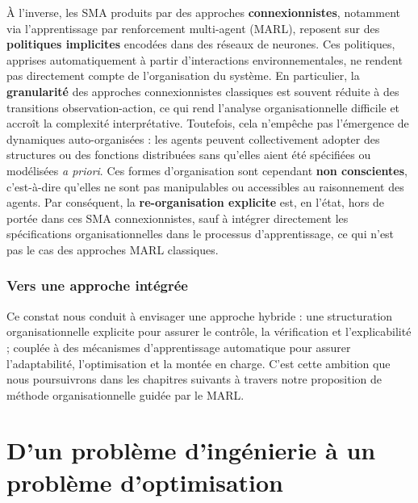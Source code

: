 À l'inverse, les \ac{SMA} produits par des approches \textbf{connexionnistes}, notamment via l'apprentissage par renforcement multi-agent (\ac{MARL}), reposent sur des \textbf{politiques implicites} encodées dans des réseaux de neurones. Ces politiques, apprises automatiquement à partir d'interactions environnementales, ne rendent pas directement compte de l'organisation du système. En particulier, la \textbf{granularité} des approches connexionnistes classiques est souvent réduite à des transitions observation-action, ce qui rend l'analyse organisationnelle difficile et accroît la complexité interprétative. Toutefois, cela n'empêche pas l'émergence de dynamiques auto-organisées : les agents peuvent collectivement adopter des structures ou des fonctions distribuées sans qu'elles aient été spécifiées ou modélisées \textit{a priori}. Ces formes d'organisation sont cependant \textbf{non conscientes}, c'est-à-dire qu'elles ne sont pas manipulables ou accessibles au raisonnement des agents. Par conséquent, la \textbf{re-organisation explicite} est, en l'état, hors de portée dans ces \ac{SMA} connexionnistes, sauf à intégrer directement les spécifications organisationnelles dans le processus d'apprentissage, ce qui n'est pas le cas des approches \ac{MARL} classiques.

\subsection*{Vers une approche intégrée}

Ce constat nous conduit à envisager une approche hybride : une structuration organisationnelle explicite pour assurer le contrôle, la vérification et l'explicabilité ; couplée à des mécanismes d'apprentissage automatique pour assurer l'adaptabilité, l'optimisation et la montée en charge. C'est cette ambition que nous poursuivrons dans les chapitres suivants à travers notre proposition de méthode organisationnelle guidée par le \ac{MARL}.



\chapter{D'un problème d'ingénierie à un problème d'optimisation}\label{chap:hypotheses}


